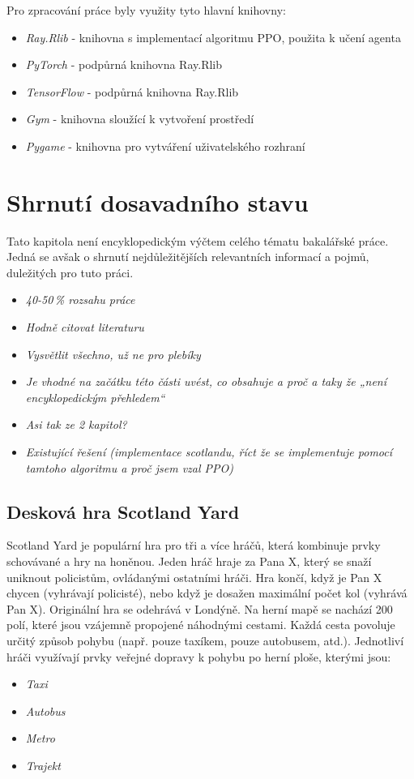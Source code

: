 Pro zpracování práce byly využity tyto hlavní knihovny:
\begin{itemize}
  \item \emph{Ray.Rlib} - knihovna s implementací algoritmu PPO, použita k učení agenta
  \item \emph{PyTorch} - podpůrná knihovna Ray.Rlib
  \item \emph{TensorFlow} - podpůrná knihovna Ray.Rlib
  \item \emph{Gym} - knihovna sloužící k vytvoření prostředí
  \item \emph{Pygame} - knihovna pro vytváření uživatelského rozhraní
\end{itemize}


\chapter{Shrnutí dosavadního stavu}
\label{dosavadni-stav}
Tato kapitola není encyklopedickým výčtem celého tématu bakalářské práce.
Jedná se avšak o shrnutí nejdůležitějších relevantních informací a pojmů, duležitých pro tuto práci.

\begin{itemize}
  \item \emph {40-50\,\% rozsahu práce}
  \item \emph{Hodně citovat literaturu}
  \item \emph{Vysvětlit všechno, už ne pro plebíky}
  \item \emph{Je vhodné na začátku této části uvést, co obsahuje a proč a taky že „není encyklopedickým přehledem“}
  \item \emph{Asi tak ze 2 kapitol?}
  \item \emph{Existující řešení (implementace scotlandu, říct že se implementuje pomocí tamtoho algoritmu a proč jsem vzal PPO)}
\end{itemize}


\section{Desková hra Scotland Yard}

Scotland Yard je populární hra pro tři a více hráčů, která kombinuje prvky schovávané a hry na honěnou.
Jeden hráč hraje za Pana X, který se snaží uniknout policistům, ovládanými ostatními hráči.
Hra končí, když je Pan X chycen (vyhrávají policisté), nebo když je dosažen maximální počet kol (vyhrává Pan X).
Originální hra se odehrává v Londýně.
Na herní mapě se nachází 200 polí, které jsou vzájemně propojené náhodnými cestami.
Každá cesta povoluje určitý způsob pohybu (např.
pouze taxíkem, pouze autobusem, atd.).
Jednotliví hráči využívají prvky veřejné dopravy k pohybu po herní ploše, kterými jsou:
\begin{itemize}
  \item \emph{Taxi}
  \item \emph{Autobus}
  \item \emph{Metro}
  \item \emph{Trajekt}
\end{itemize}

